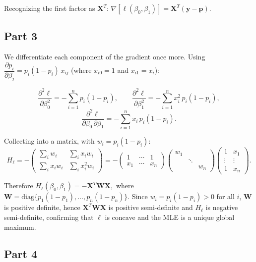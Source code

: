 \documentclass[letterpaper]{article}
\begin{document}
		Recognizing the first factor as $\mathbf{X}^T$: $
		{\nabla[\ell(\beta_0,\beta_1)] = \mathbf{X}^T(\mathbf{y}-\mathbf{p}).}
		$
		
		\subsection{Part 3}
		
		We differentiate each component of the gradient once more. Using
		$\dfrac{\partial p_i}{\partial \beta_j} = p_i(1-p_i)\,x_{ij}$
		(where $x_{i0}=1$ and $x_{i1}=x_i$):
		
		\[
		\frac{\partial^2\ell}{\partial\beta_0^2}
		= -\sum_{i=1}^n p_i(1-p_i),
		\qquad
		\frac{\partial^2\ell}{\partial\beta_1^2}
		= -\sum_{i=1}^n x_i^2\,p_i(1-p_i),
		\]
		\[
		\frac{\partial^2\ell}{\partial\beta_0\,\partial\beta_1}
		= -\sum_{i=1}^n x_i\,p_i(1-p_i).
		\]
		
		Collecting into a matrix, with $w_i = p_i(1-p_i)$:
		\[
		H_\ell
		= -\begin{pmatrix} \sum_i w_i & \sum_i x_i w_i \\ \sum_i x_i w_i & \sum_i x_i^2 w_i \end{pmatrix}
		= -\begin{pmatrix} 1 & \cdots & 1 \\ x_1 & \cdots & x_n \end{pmatrix}
		\begin{pmatrix} w_1 & & \\ & \ddots & \\ & & w_n \end{pmatrix}
		\begin{pmatrix} 1 & x_1 \\ \vdots & \vdots \\ 1 & x_n \end{pmatrix}.
		\]
		
		Therefore $
		{H_\ell(\beta_0,\beta_1) = -\mathbf{X}^T\mathbf{W}\mathbf{X},}
		$
		where $\mathbf{W} = \mathrm{diag}\{p_1(1-p_1),\ldots,p_n(1-p_n)\}$.
		Since $w_i = p_i(1-p_i) > 0$ for all $i$, $\mathbf{W}$ is positive definite,
		hence $\mathbf{X}^T\mathbf{W}\mathbf{X}$ is positive semi-definite and
		$H_\ell$ is negative semi-definite, confirming that $\ell$ is concave and
		the MLE is a unique global maximum.
		
		\subsection{Part 4}
\end{document}
